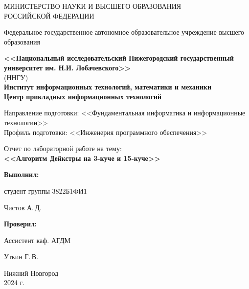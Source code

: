 \documentclass[a4paper,12pt]{article}
\begin{document}
	\begin{titlepage}
	\begin{center}
		\large
		{МИНИСТЕРСТВО НАУКИ И ВЫСШЕГО ОБРАЗОВАНИЯ\\ РОССИЙСКОЙ ФЕДЕРАЦИИ}
		
		Федеральное государственное автономное образовательное учреждение высшего образования
		\vspace{0.5cm}
		
		\textbf{<<Национальный исследовательский Нижегородский государственный университет им. Н.И. Лобачевского>>}\\
		(ННГУ)\\
		\vspace{1cm}
		\textbf{Институт информационных технологий, математики и механики}\\
		\vspace{1cm}
		\textbf{Центр прикладных информационных технологий}
		\vspace{1cm}
		
		Направление подготовки: <<Фундаментальная информатика и информационные технологии>>\\
		Профиль подготовки: <<Инженерия программного обеспечения>>
		\vfill
		
		\vfill
		
		\Large
		Отчет по лабораторной работе на тему:\\
		\textbf{<<Алгоритм Дейкстры на 3-куче и 15-куче>>}
		{\LARGE 
		}
		\bigskip
		
		
	\end{center}
	\vfill
	
	\hfill\begin{minipage}{0.4\textwidth}
		\textbf{Выполнил:} 

            студент группы 	3822Б1ФИ1  

            \underline{\hspace{3cm}} Чистов А.\,Д. \bigskip
            
	\end{minipage}%
	
	\hfill\begin{minipage}{0.4\textwidth}
		\textbf{Проверил:}
		
		Ассистент каф. АГДМ
  
		\underline{\hspace{3cm}} Уткин Г.\,В.
	\end{minipage}%
	\vfill
	
	\begin{center}
		Нижний Новгород\\
		2024 г.
	\end{center}
\end{titlepage}
\thispagestyle{empty}
\tableofcontents
\newpage

	
	
	
	
	
	
	
    
    
    
\end{document}
